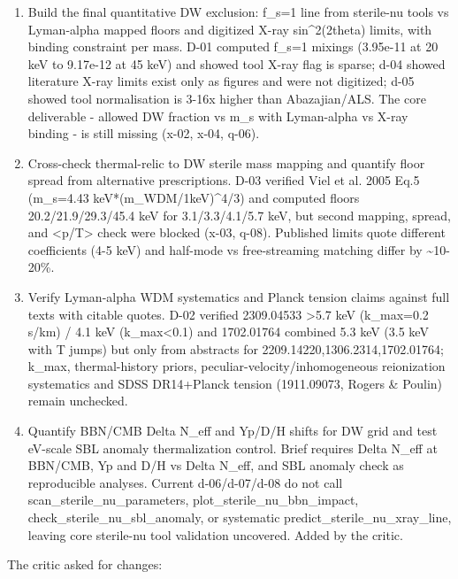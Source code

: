\documentclass[11pt,a4paper]{article}
\begin{document}
\begin{enumerate}
  \item Build the final quantitative DW exclusion: f\_s=1 line from sterile-nu tools vs Lyman-alpha mapped floors and digitized X-ray sin\textasciicircum{}2(2theta) limits, with binding constraint per mass. D-01 computed f\_s=1 mixings (3.95e-11 at 20 keV to 9.17e-12 at 45 keV) and showed tool X-ray flag is sparse; d-04 showed literature X-ray limits exist only as figures and were not digitized; d-05 showed tool normalisation is 3-16x higher than Abazajian/ALS. The core deliverable - allowed DW fraction vs m\_s with Lyman-alpha vs X-ray binding - is still missing (x-02, x-04, q-06).
  \item Cross-check thermal-relic to DW sterile mass mapping and quantify floor spread from alternative prescriptions. D-03 verified Viel et al. 2005 Eq.5 (m\_s=4.43 keV*(m\_WDM/1keV)\textasciicircum{}4/3) and computed floors 20.2/21.9/29.3/45.4 keV for 3.1/3.3/4.1/5.7 keV, but second mapping, spread, and \textless{}p/T\textgreater{} check were blocked (x-03, q-08). Published limits quote different coefficients (4-5 keV) and half-mode vs free-streaming matching differ by \textasciitilde{}10-20\%.
  \item Verify Lyman-alpha WDM systematics and Planck tension claims against full texts with citable quotes. D-02 verified 2309.04533 \textgreater{}5.7 keV (k\_max=0.2 s/km) / 4.1 keV (k\_max\textless{}0.1) and 1702.01764 combined 5.3 keV (3.5 keV with T jumps) but only from abstracts for 2209.14220,1306.2314,1702.01764; k\_max, thermal-history priors, peculiar-velocity/inhomogeneous reionization systematics and SDSS DR14+Planck tension (1911.09073, Rogers \& Poulin) remain unchecked.
  \item Quantify BBN/CMB Delta N\_eff and Yp/D/H shifts for DW grid and test eV-scale SBL anomaly thermalization control. Brief requires Delta N\_eff at BBN/CMB, Yp and D/H vs Delta N\_eff, and SBL anomaly check as reproducible analyses. Current d-06/d-07/d-08 do not call scan\_sterile\_nu\_parameters, plot\_sterile\_nu\_bbn\_impact, check\_sterile\_nu\_sbl\_anomaly, or systematic predict\_sterile\_nu\_xray\_line, leaving core sterile-nu tool validation uncovered. Added by the critic.
\end{enumerate}
The critic asked for changes:
\end{document}
